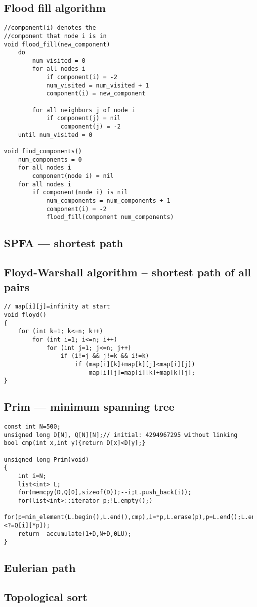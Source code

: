 \documentclass[a4paper]{article}
\begin{document}
\subsection{Flood fill algorithm}

\begin{verbatim}
//component(i) denotes the
//component that node i is in
void flood_fill(new_component) 
	do
		num_visited = 0
		for all nodes i
			if component(i) = -2
			num_visited = num_visited + 1
			component(i) = new_component
		
		for all neighbors j of node i
			if component(j) = nil
				component(j) = -2
	until num_visited = 0 

void find_components()
	num_components = 0
	for all nodes i
		component(node i) = nil
	for all nodes i
		if component(node i) is nil
			num_components = num_components + 1
			component(i) = -2
			flood_fill(component num_components)
\end{verbatim}

\subsection{SPFA --- shortest path}

\subsection{Floyd-Warshall algorithm -- shortest path of all pairs}

\begin{verbatim}
// map[i][j]=infinity at start
void floyd()
{
	for (int k=1; k<=n; k++)
		for (int i=1; i<=n; i++)
			for (int j=1; j<=n; j++)
				if (i!=j && j!=k && i!=k)
					if (map[i][k]+map[k][j]<map[i][j])
						map[i][j]=map[i][k]+map[k][j];
}
\end{verbatim}

\subsection{Prim --- minimum spanning tree}
\begin{verbatim}
const int N=500;
unsigned long D[N], Q[N][N];// initial: 4294967295 without linking
bool cmp(int x,int y){return D[x]<D[y];}

unsigned long Prim(void)
{
	int i=N;
	list<int> L;
	for(memcpy(D,Q[0],sizeof(D));--i;L.push_back(i));
	for(list<int>::iterator p;!L.empty();)
	for(p=min_element(L.begin(),L.end(),cmp),i=*p,L.erase(p),p=L.end();L.end()!=++p;D[*p]<?=Q[i][*p]);
	return	accumulate(1+D,N+D,0LU);
}
\end{verbatim}

\subsection{Eulerian path}

\subsection{Topological sort}
\end{document}
